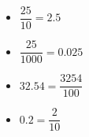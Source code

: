 \documentclass[12pt,a4paper]{article}
\begin{document}
\begin{myexs}
	\begin{multicols}{2}
		\begin{itemize}
			\item $\dfrac{25}{10} = \num{2.5}$
			\item $\dfrac{25}{1000} = \num{0.025}$
			\item $\num{32.54} = \dfrac{3254}{100}$
			\item $\num{0.2} = \dfrac{2}{10}$
			
		\end{itemize}
	\end{multicols}
\end{myexs}
%
%
%
%
%
%



%
\end{document}
